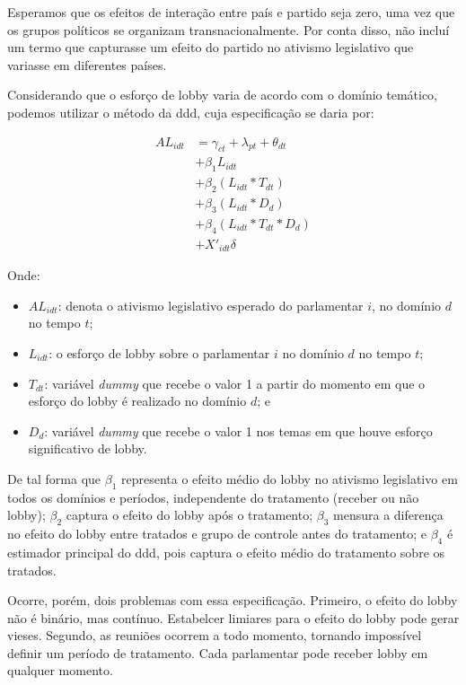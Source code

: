 Esperamos que os efeitos de interação entre país e partido seja zero, uma vez que os grupos políticos se organizam transnacionalmente. Por conta disso, não incluí um termo que capturasse um efeito do partido no ativismo legislativo que variasse em diferentes países. 

Considerando que o esforço de lobby varia de acordo com o domínio temático, podemos utilizar o método da \acrfull{ddd}, cuja especificação se daria por:

\begin{equation}
    \begin{split}
        AL_{idt} &= \gamma_{ct} + \lambda_{pt} + \theta_{dt}\\
        &+ \beta_1 L_{idt}\\
        &+ \beta_2 (L_{idt} * T_{dt})\\
        &+ \beta_3 (L_{idt} * D_d)\\
        &+ \beta_4 (L_{idt} * T_{dt} * D_d)\\
        &+ X'_{idt} \delta
    \end{split}
\end{equation}

Onde:
\begin{itemize}
    \item $AL_{idt}$: denota o ativismo legislativo esperado do parlamentar $i$, no domínio $d$ no tempo $t$;
    \item $L_{idt}$: o esforço de lobby sobre o parlamentar $i$ no domínio $d$ no tempo $t$;
    \item $T_{dt}$: variável \textit{dummy} que recebe o valor 1 a partir do momento em que o esforço do lobby é realizado no domínio $d$; e
    \item $D_d$: variável \textit{dummy} que recebe o valor 1 nos temas em que houve esforço significativo de lobby.
\end{itemize}

De tal forma que $\beta_1$ representa o efeito médio do lobby no ativismo legislativo em todos os domínios e períodos, independente do tratamento (receber ou não lobby); $\beta_2$ captura o efeito do lobby após o tratamento; $\beta_3$ mensura a diferença no efeito do lobby entre tratados e grupo de controle antes do tratamento; e $\beta_4$ é estimador principal do \acrshort{ddd}, pois captura o efeito médio do tratamento sobre os tratados.

Ocorre, porém, dois problemas com essa especificação. Primeiro, o efeito do lobby não é binário, mas contínuo. Estabelcer limiares para o efeito do lobby pode gerar vieses. Segundo, as reuniões ocorrem a todo momento, tornando impossível definir um período de tratamento. Cada parlamentar pode receber lobby em qualquer momento.  %


